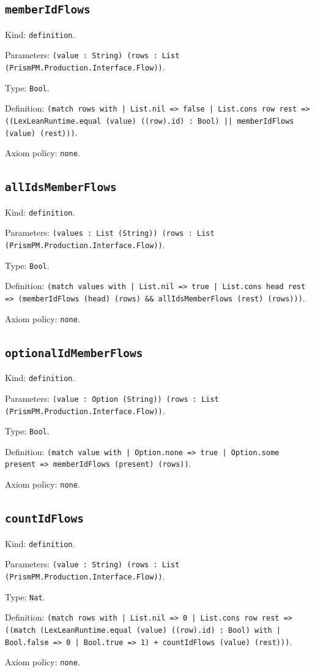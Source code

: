 \documentclass[11pt]{article}
\begin{document}
\subsection*{\texttt{memberIdFlows}}
\noindent Kind: \texttt{definition}.\par
\noindent Parameters: \texttt{(value : String) (rows : List (PrismPM.Production.Interface.Flow))}.\par
\noindent Type: \texttt{Bool}.\par
\noindent Definition: \texttt{(match rows with | List.nil => false | List.cons row rest => ((LexLeanRuntime.equal (value) ((row).id) : Bool) || memberIdFlows (value) (rest)))}.\par
\noindent Axiom policy: \texttt{none}.\par
\subsection*{\texttt{allIdsMemberFlows}}
\noindent Kind: \texttt{definition}.\par
\noindent Parameters: \texttt{(values : List (String)) (rows : List (PrismPM.Production.Interface.Flow))}.\par
\noindent Type: \texttt{Bool}.\par
\noindent Definition: \texttt{(match values with | List.nil => true | List.cons head rest => (memberIdFlows (head) (rows) \&\& allIdsMemberFlows (rest) (rows)))}.\par
\noindent Axiom policy: \texttt{none}.\par
\subsection*{\texttt{optionalIdMemberFlows}}
\noindent Kind: \texttt{definition}.\par
\noindent Parameters: \texttt{(value : Option (String)) (rows : List (PrismPM.Production.Interface.Flow))}.\par
\noindent Type: \texttt{Bool}.\par
\noindent Definition: \texttt{(match value with | Option.none => true | Option.some present => memberIdFlows (present) (rows))}.\par
\noindent Axiom policy: \texttt{none}.\par
\subsection*{\texttt{countIdFlows}}
\noindent Kind: \texttt{definition}.\par
\noindent Parameters: \texttt{(value : String) (rows : List (PrismPM.Production.Interface.Flow))}.\par
\noindent Type: \texttt{Nat}.\par
\noindent Definition: \texttt{(match rows with | List.nil => 0 | List.cons row rest => ((match (LexLeanRuntime.equal (value) ((row).id) : Bool) with | Bool.false => 0 | Bool.true => 1) + countIdFlows (value) (rest)))}.\par
\noindent Axiom policy: \texttt{none}.\par
\end{document}
